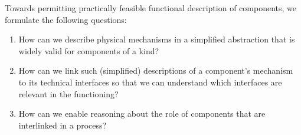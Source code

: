 \documentclass[sigconf]{acmart}
\begin{document}

Towards permitting practically feasible functional description of components, we formulate the following questions:
\begin{enumerate}
    \item How can we describe physical mechanisms in a simplified abstraction that is widely valid for components of a kind? 
    \item How can we link such (simplified) descriptions of a component's mechanism to its technical interfaces so that we can understand which interfaces are relevant in the functioning? 
    \item How can we enable reasoning about the role of components that are interlinked in a process?
\end{enumerate}
\end{document}
